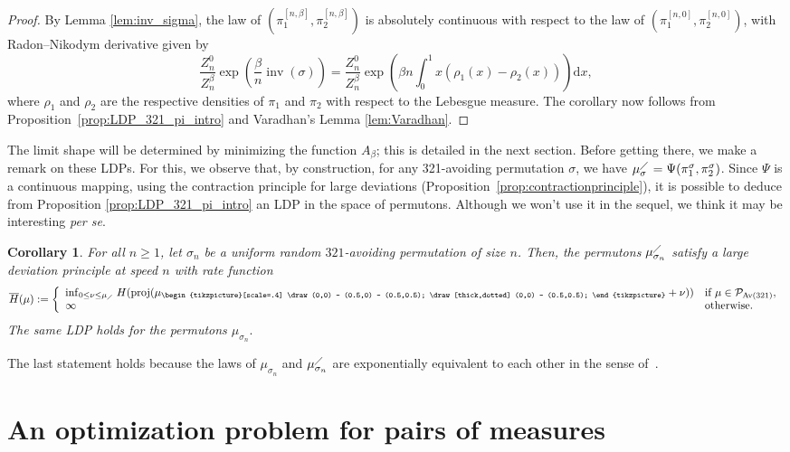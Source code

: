 \documentclass[a4paper,11pt]{amsart}
\DeclareMathOperator{\Av}{Av}
\DeclareMathOperator{\inv}{inv}
\DeclareMathOperator{\proj}{proj}
\newcommand{\PAvTDU}{\mathcal P_{\Av(321)}}
\newtheorem{cor}[thm]{Corollary}
\theoremstyle{definition}
\newcommand{\lrtriangle}{{\begin{tikzpicture}[scale=.4]
  \draw (0,0) -- (0.5,0) -- (0.5,0.5);
  \draw[thick,dotted] (0,0) -- (0.5,0.5);
\end{tikzpicture}}}
\begin{document}
\begin{proof} By Lemma \ref{lem:inv_sigma},  the law of $(\pi_1^{[n,\beta]}, \pi_2^{[n,\beta]})$ is absolutely continuous with respect to the law of $(\pi_1^{[n,0]}, \pi_2^{[n,0]})$, with Radon--Nikodym derivative given by
    \[ \frac{Z_n^0}{Z_n^{\beta}} \exp \left( \frac{\beta}{n} \inv(\sigma) \right) = \frac{Z_n^0}{Z_n^{\beta}} \exp \left( \beta n \int_0^1 x(\rho_1(x)-\rho_2(x)) \right) \mathrm{d}x, \]
    where $\rho_1$ and $\rho_2$ are the respective densities of $\pi_1$ and $\pi_2$ with respect to the Lebesgue measure.
    The corollary now follows from
    Proposition~\ref{prop:LDP_321_pi_intro} and Varadhan's Lemma \ref{lem:Varadhan}.
\end{proof}

The limit shape will be determined by minimizing the function $A_\beta$; this is detailed in the next section. Before getting there, we make a remark on these LDPs.
For this, we observe that, by construction, for any 321-avoiding permutation $\sigma$, we have $\mu_{\sigma}^\diagup=\Psi(\pi_1^\sigma,\pi_2^\sigma)$.
Since $\Psi$ is a continuous mapping,
using  the contraction principle for large deviations (Proposition~\ref{prop:contractionprinciple}), it is possible to deduce from Proposition \ref{prop:LDP_321_pi_intro} an LDP in the space of permutons. Although we won't use it in the sequel, we think it may be interesting \emph{per se}.

\begin{cor}\label{cor:LDP_uniform_321}
    For all $n \geq 1$, let $\sigma_n$ be a uniform random $321$-avoiding permutation of size $n$.
    Then, the permutons $\mu_{\sigma_n}^\diagup$ satisfy a large deviation principle at speed $n$ with rate function
    \[\overline{H}(\mu) := \left\{
    \begin{array}{ll}
      \inf_{0 \le \nu \le \mu_{\diagup}} H(\proj(\mu_{\lrtriangle}+\nu)) & \textrm{if } \mu \in  \PAvTDU,\\
      \infty & \textrm{otherwise.}
    \end{array}
\right.\]
The same LDP holds for the permutons $\mu_{\sigma_n}.$
\end{cor}
The last statement holds because the laws of $\mu_{\sigma_n}$ and $\mu_{\sigma_n}^\diagup$
are exponentially equivalent to each other in the sense of~\cite[Definition 4.2.10]{dembo1998large-deviations}.


\section{An optimization problem for pairs of measures}
\end{document}
